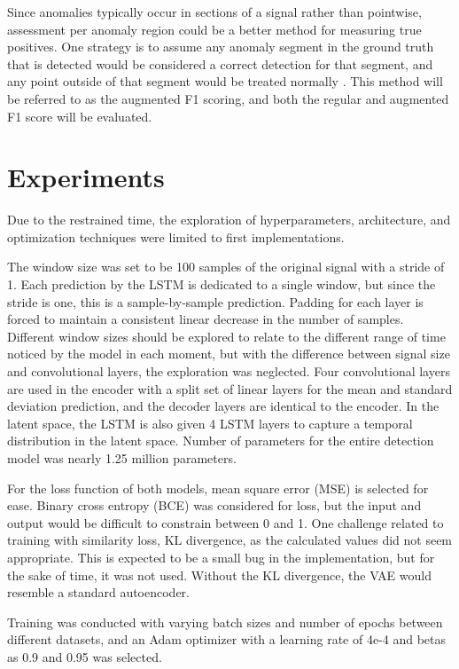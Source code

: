 \documentclass[conference]{IEEEtran}
\begin{document}
Since anomalies typically occur in sections of a signal rather than pointwise, assessment per anomaly region could be a better method for measuring true positives. One strategy is to assume any anomaly segment in the ground truth that is detected would be considered a correct detection for that segment, and any point outside of that segment would be treated normally \cite{aug_score}. This method will be referred to as the augmented F1 scoring, and both the regular and augmented F1 score will be evaluated.

\section{Experiments}
Due to the restrained time, the exploration of hyperparameters, architecture, and optimization techniques were limited to first implementations. 

The window size was set to be 100 samples of the original signal with a stride of 1. Each prediction by the LSTM is dedicated to a single window, but since the stride is one, this is a sample-by-sample prediction. Padding for each layer is forced to maintain a consistent linear decrease in the number of samples. Different window sizes should be explored to relate to the different range of time noticed by the model in each moment, but with the difference between signal size and convolutional layers, the exploration was neglected. Four convolutional layers are used in the encoder with a split set of linear layers for the mean and standard deviation prediction, and the decoder layers are identical to the encoder. In the latent space, the LSTM is also given 4 LSTM layers to capture a temporal distribution in the latent space. Number of parameters for the entire detection model was nearly 1.25 million parameters.

For the loss function of both models, mean square error (MSE) is selected for ease. Binary cross entropy (BCE) was considered for loss, but the input and output would be difficult to constrain between 0 and 1. One challenge related to training with similarity loss, KL divergence, as the calculated values did not seem appropriate. This is expected to be a small bug in the implementation, but for the sake of time, it was not used. Without the KL divergence, the VAE would resemble a standard autoencoder.

Training was conducted with varying batch sizes and number of epochs between different datasets, and an Adam optimizer with a learning rate of 4e-4 and betas as 0.9 and 0.95 was selected. 
\end{document}
